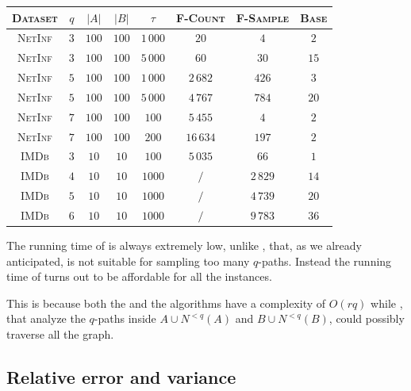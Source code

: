 \begin{table}[h]
	\centering
	\begin{tabular}{|c|c|c|c|c|c|c|c|}
		\hline
		\textsc{Dataset} & $q$ & $|A|$ & $|B|$ & $\tau$      & \textsc{F-Count} & \textsc{F-Sample} & \textsc{Base} \\ \hline \hline
		\textsc{NetInf}  & $3$ & $100$ & $100$ & $1\,000$ & $20$             & $4$               & $2$           \\ \hline
		\textsc{NetInf}  & $3$ & $100$ & $100$ & $5\,000$ & $60$             & $30$              & $15$          \\ \hline
		\textsc{NetInf}  & $5$ & $100$ & $100$ & $1\,000$ & $2\,682$         & $426$             & $3$           \\ \hline
		\textsc{NetInf}  & $5$ & $100$ & $100$ & $5\,000$ & $4\,767$         & $784$             & $20$          \\ \hline
		\textsc{NetInf}  & $7$ & $100$ & $100$ & $100$    & $5\,455$         & $4$               & $2$           \\ \hline
		\textsc{NetInf}  & $7$ & $100$ & $100$ & $200$    & $16\,634$        & $197$             & $2$           \\ \hline \hline
		\textsc{IMDb}    & $3$ & $10$  & $10$  & $100$    & $5\,035$         & $66$              & $1$           \\ \hline
		\textsc{IMDb}    & $4$ & $10$  & $10$  & $1000$   & $/$              & $2\,829$          & $14$          \\ \hline
		\textsc{IMDb}    & $5$ & $10$  & $10$  & $1000$   & $/$              & $4\,739$          & $20$          \\ \hline
		\textsc{IMDb}    & $6$ & $10$  & $10$  & $1000$   & $/$              & $9\,783$          & $36$          \\ \hline
	\end{tabular}
\end{table}

The running time of \base is always extremely low, 
unlike \fcount, that, as we already anticipated, is not suitable for sampling too many $q$-paths.
Instead the running time of \fsamp turns out to be affordable for all the instances. 

This is because both the \fsamp and the \base algorithms have a complexity of $O(rq)$ while 
\fcount, that analyze the $q$-paths inside $A \cup N^{<q}(A)$ and $B \cup N^{<q}(B)$, could possibly traverse all the graph.

\subsection*{Relative error and variance}

